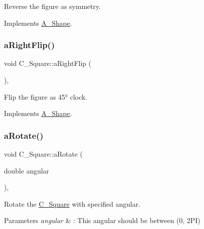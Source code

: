 Reverse the figure as symmetry. 



Implements \hyperlink{classA__Shape_afe2c7969d647f6358da13879a7534ecb}{A\+\_\+\+Shape}.

\mbox{\label{classC__Square_a0ea2df0d283ee4ffa911163e55a0a637}} 
\subsubsection{\texorpdfstring{a\+Right\+Flip()}{aRightFlip()}}
{\footnotesize\ttfamily void C\+\_\+\+Square\+::a\+Right\+Flip (\begin{DoxyParamCaption}{ }\end{DoxyParamCaption})\hspace{0.3cm}{\ttfamily [override]}, {\ttfamily [virtual]}}



Flip the figure as 45° clock. 



Implements \hyperlink{classA__Shape_a892688cbbad3297e00e87cce0dbfc76d}{A\+\_\+\+Shape}.

\mbox{\label{classC__Square_af74175a5e8d61216d68fde18ef9c9481}} 
\subsubsection{\texorpdfstring{a\+Rotate()}{aRotate()}}
{\footnotesize\ttfamily void C\+\_\+\+Square\+::a\+Rotate (\begin{DoxyParamCaption}\item[{double}]{angular }\end{DoxyParamCaption})\hspace{0.3cm}{\ttfamily [override]}, {\ttfamily [virtual]}}



Rotate the \hyperlink{classC__Square}{C\+\_\+\+Square} with specified angular. 


\begin{DoxyParams}{Parameters}
{\em angular} & \+: This angular should be between (0, 2\+PI) \\
\hline
\end{DoxyParams}


